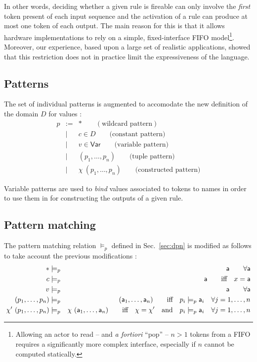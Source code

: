 \medskip
\noindent
In other words, deciding whether a given rule is fireable can only involve the \emph{first} token
present of each input sequence and the activation of a rule can produce at most one token of each
output. The main reason for this is that it allows hardware implementations
to rely on a simple, fixed-interface FIFO model\footnote{Allowing an actor to read -- and \emph{a
    fortiori} ``pop'' -- $n>1$ tokens from a FIFO requires a significantly more complex interface,
  especially if $n$ cannot be computed statically.}. Moreover, our experience, based upon a large
set of realistic applications, showed that this restriction does not in practice limit the
expressiveness of the language.

\subsection{Patterns}
\label{cpn-patterns}

The set of individual patterns is augmented to accomodate the new definition of the domain $D$ for
values :
\begin{eqnarray*}
  p & := & * \qquad (\text{wildcard pattern}) \\
    & |  &  c \in D \qquad \text{(constant pattern)} \\
    & |  & v \in \mathsf{Var} \qquad \text{(variable pattern)} \\
    & |  & (p_1,\ldots,p_n) \qquad \text{(tuple pattern)} \\
    & |  & \chi\ (p_1,\ldots,p_n) \qquad \text{(constructed pattern)}
\end{eqnarray*}

\medskip
\noindent
Variable patterns are used to \emph{bind} values associated to tokens to names in order to use them
in for constructing the outputs of a given rule. 

\subsection{Pattern matching}
\label{cpn-pattern-match}

The pattern matching relation $\models_p$ defined in Sec.~\ref{sec:dpn} is modified as follows
to take account the previous modifications :
\begin{eqnarray*}
* & \models_p & \mathsf{a} \qquad \forall \mathsf{a} \\
c & \models_p & \mathsf{a} \qquad \text{iff}\quad x=\mathsf{a}\\
v & \models_p & \mathsf{a} \qquad \forall \mathsf{a} \\
(p_1,\ldots,p_n) & \models_p & (\mathsf{a}_1,\ldots,\mathsf{a}_n) \qquad \text{iff}\quad p_i \models_p \mathsf{a}_i \quad \forall j=1,\ldots,n \\
\chi'\ (p_1,\ldots,p_n) & \models_p & \chi\ (\mathsf{a}_1,\ldots,\mathsf{a}_n) \qquad \text{iff}\quad \chi = \chi' \quad \text{and} \quad p_i \models_p \mathsf{a}_i \quad \forall j=1,\ldots,n 
\end{eqnarray*}

